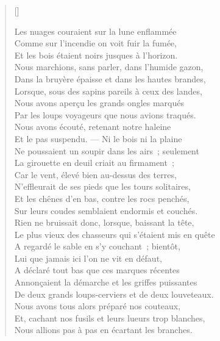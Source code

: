 \documentclass[12pt,a4paper,french]{scrartcl}
\begin{document}
\settowidth{\versewidth}{Le plus vieux des chasseurs qui s’étaient mis en quête}

\begin{verse}[\versewidth]
\hspace{0.5\versewidth}{\poemtitlefont\small%
I
}%

Les nuages couraient sur la lune enflammée\\
Comme sur l’incendie on voit fuir la fumée,\\
Et les bois étaient noirs jusques à l’horizon.\\
Nous marchions, sans parler, dans l’humide gazon,\\
Dans la bruyère épaisse et dans les hautes brandes,\\
Lorsque, sous des sapins pareils à ceux des landes,\\
Nous avons aperçu les grands ongles marqués\\
Par les loups voyageurs que nous avions traqués.\\
Nous avons écouté, retenant notre haleine\\
Et le pas suspendu. --- Ni le bois ni la plaine\\
Ne poussaient un soupir dans les airs ; seulement\\
La girouette en deuil criait au firmament ;\\
Car le vent, élevé bien au-dessus des terres,\\
N’effleurait de ses pieds que les tours solitaires,\\
Et les chênes d’en bas, contre les rocs penchés,\\
Sur leurs coudes semblaient endormis et couchés.\\
Rien ne bruissait donc, lorsque, baissant la tête,\\
Le plus vieux des chasseurs qui s’étaient mis en quête\\
A regardé le sable en s’y couchant ; bientôt,\\
Lui que jamais ici l’on ne vit en défaut,\\
A déclaré tout bas que ces marques récentes\\
Annonçaient la démarche et les griffes puissantes\\
De deux grands loups-cerviers et de deux louveteaux.\\
Nous avons tous alors préparé nos couteaux,\\
Et, cachant nos fusils et leurs lueurs trop blanches,\\
Nous allions pas à pas en écartant les branches.\\

\end{verse}
\end{document}
